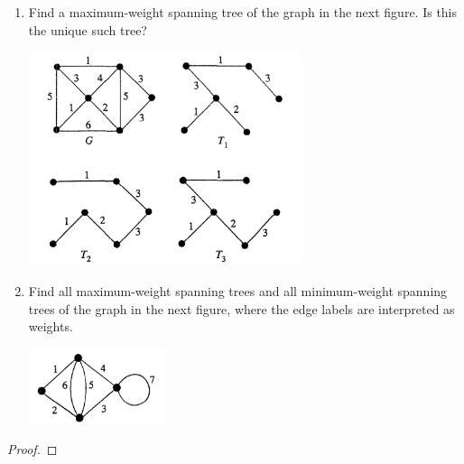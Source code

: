 \prob
{
    \begin{enumerate}[label=(\roman*)]
        \item   Find a maximum-weight spanning tree of the graph in the next figure. Is this the unique such tree?
                \begin{center}
                    \includegraphics[width=8cm]{Test1/Problem14/Figure-i.png}
                \end{center}
                
        \item   Find all maximum-weight spanning trees and all minimum-weight spanning trees of the graph in the next
                figure, where the edge labels are interpreted as weights.
                \begin{center}
                    \includegraphics[width=4cm]{Test1/Problem14/Figure-ii.png}
                \end{center}
    \end{enumerate}
}
\begin{proof}
\end{proof}